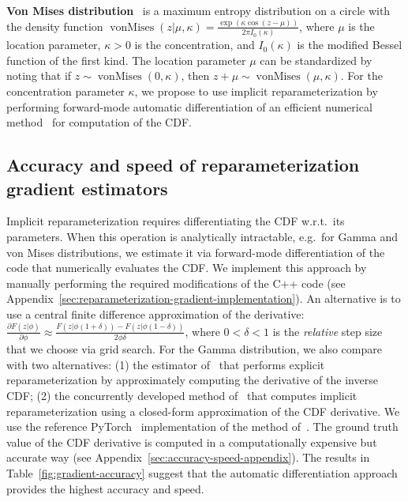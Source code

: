 \documentclass{article}
\newcommand{\wrt}{w.r.t.~}
\newcommand{\eg}{e.g.~}
\begin{document}
\textbf{Von Mises distribution}~\cite{von1918uber,mardia2009directional} is a maximum entropy distribution on a circle with the density function $\operatorname{vonMises}(z | \mu, \kappa) = \frac{\exp(\kappa \cos(z - \mu))}{2 \pi I_0 (\kappa)}$, where $\mu$ is the location parameter, $\kappa > 0$ is the concentration, and $I_0(\kappa)$ is the modified Bessel function of the first kind.
The location parameter $\mu$ can be standardized by noting that if $z \sim \operatorname{vonMises}(0, \kappa)$, then $z + \mu \sim \operatorname{vonMises}(\mu, \kappa)$.
For the concentration parameter $\kappa$, we propose to use implicit reparameterization by performing forward-mode automatic differentiation of an efficient numerical method~\cite{hill1977algorithm} for computation of the CDF.

\subsection{Accuracy and speed of reparameterization gradient estimators}
Implicit reparameterization requires differentiating the CDF \wrt its parameters.
When this operation is analytically intractable, \eg for Gamma and von Mises distributions, we estimate it via forward-mode  differentiation of the code that numerically evaluates the CDF.
We implement this approach by manually performing the required modifications of the C++ code (see Appendix~\ref{sec:reparameterization-gradient-implementation}).
An alternative is to use a central finite difference approximation of the derivative: $\frac{\partial F(z | \phi)}{\partial \phi} \approx \frac{F(z | \phi (1 + \delta)) - F(z | \phi (1 - \delta))}{2 \phi \delta}$, where $0 < \delta < 1$ is the \emph{relative} step size that we choose via grid search.
For the Gamma distribution, we also compare with two alternatives: (1) the estimator of~\citet{knowles2015stochastic} that performs explicit reparameterization by approximately computing the derivative of the inverse CDF; (2) the concurrently developed method of~\citet{jankowiak2018pathwisebeyond} that computes implicit reparameterization using a closed-form approximation of the CDF derivative.
We use the reference PyTorch~\citet{paszke2017automatic} implementation of the method of~\citet{jankowiak2018pathwisebeyond}.
The ground truth value of the CDF derivative is computed in a computationally expensive but accurate way (see Appendix~\ref{sec:accuracy-speed-appendix}).
The results in Table~\ref{fig:gradient-accuracy} suggest that the automatic differentiation approach provides the highest accuracy and speed.
\end{document}
